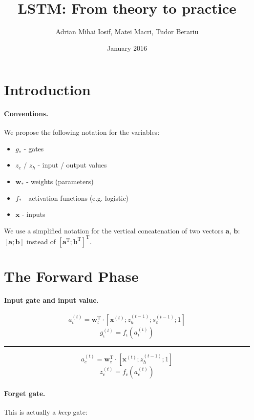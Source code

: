 \documentclass[11pt]{article}
\title{LSTM: From theory to practice}
\author{Adrian Mihai Iosif, Matei Macri, Tudor Berariu}
\date{January 2016}
\begin{document}
\maketitle

\section{Introduction}

\paragraph{Conventions.} We propose the following notation for the variables:
\begin{itemize}
    \item $g_{*}$ - gates
    \item $z_{c}$ / $z_h$ - input / output values
    \item $\mathbf{w}_{*}$ - weights (parameters)
    \item $f_{*}$ - activation functions (e.g. logistic)
    \item $\mathbf{x}$ - inputs
\end{itemize}

We use a simplified notation for the vertical concatenation of two vectors $\mathbf{a}$, $\mathbf{b}$: $\left[\mathbf{a}; \mathbf{b}\right]$ instead of $\left[ \mathbf{a}^{\text{T}} ; \mathbf{b}^{\text{T}} \right]^{\text{T}}$.

\section{The Forward Phase}

\paragraph{Input gate and input value.}

$$a_{\iota}^{(t)} = \mathbf{w}_{\iota}^{\text{T}} \cdot \left[\mathbf{x}^{(t)}; z_{h}^{(t-1)}; s_c^{(t-1)}; 1\right]$$
$$g_{\iota}^{(t)} = f_{\iota}\left(a_{\iota}^{(t)}\right)$$

\begin{center}\rule[0.5ex]{.3\linewidth}{1pt}\end{center}

$$a_{c}^{(t)} = \mathbf{w}_{c}^{\text{T}} \cdot \left[\mathbf{x}^{(t)}; z_{h}^{(t-1)}; 1\right]$$
$$z_{c}^{(t)} = f_{c}\left(a_{c}^{(t)}\right)$$

\paragraph{Forget gate.} This is actually a \emph{keep} gate:
\end{document}
